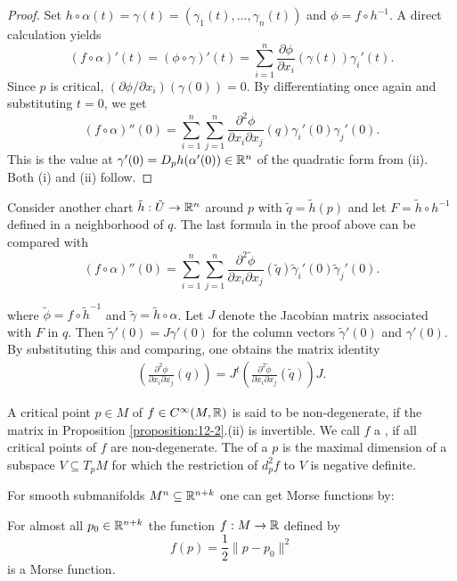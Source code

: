 \begin{proof}
  Set $h\circ\alpha(t) = \gamma(t) = (\gamma_1(t), \ldots, \gamma_n(t))$ and $\phi = f\circ h^{-1}$. A direct 
  calculation yields
  \[
    (f\circ\alpha)'(t)
    = (\phi\circ\gamma)'(t)
    = \sum_{i=1}^{n}{\frac{\partial\phi}{\partial x_i}(\gamma(t))\gamma_i'(t)}.
  \]
  Since $p$ is critical, $(\partial\phi/\partial x_i)(\gamma(0)) = 0$. By differentiating once again and substituting 
  $t=0$, we get 
  \[
    (f\circ\alpha)''(0)
    = \sum_{i=1}^n\sum_{j=1}^n{\frac{\partial^2\phi}{\partial x_i\partial x_j}(q)\gamma_i'(0)\gamma_j'(0)}.
  \]
  This is the value at $\gamma'(0) = D_ph(\alpha'(0))\in{\ensuremath{\mathbb{R}}}^n$ of the quadratic form from (ii).
  Both (i) and (ii) follow.
\end{proof}

Consider another chart $\tilde{h}:\tilde{U}\to{\ensuremath{\mathbb{R}}}^n$ around $p$ with $\tilde{q} = \tilde{h}(p)$ and let $F=\tilde{h}\circ h^{-1}$
defined in a neighborhood of $q$. The last formula in the proof above can be compared with 
\[ 
  (f\circ\alpha)''(0)
  = \sum_{i=1}^n\sum_{j=1}^n{\frac{\partial^2\tilde{\phi}}{\partial x_i\partial x_j}(\tilde{q})\tilde\gamma_i'(0)\tilde\gamma_j'(0)}.
\]

where $\tilde{\phi} = f\circ\tilde{h}^{-1}$ and $\tilde{\gamma}=\tilde{h}\circ\alpha$. Let $J$ denote the Jacobian matrix associated
with $F$ in $q$. Then $\tilde{\gamma}'(0)=J\gamma'(0)$ for the column vectors $\tilde{\gamma}'(0)$ and $\gamma'(0)$. 
By substituting this and comparing, one obtains the matrix identity
\begin{align}\label{eq:12-3}
  \left(\frac{\partial^2\phi}{\partial x_i\partial x_j}(q)\right) 
  = J^t\left(\frac{\partial^2\tilde{\phi}}{\partial x_i\partial x_j }(\tilde{q})\right)J.
\end{align}

\begin{definition}\label{definition:12-3}
  A critical point $p\in M$ of $f\in C^\infty(M, {\mathbb{R}})$ is said to be non-degenerate, if the matrix in 
Proposition \ref{proposition:12-2}.(ii) is invertible. We call $f$ a , if all critical points of $f$ are 
non-degenerate. The  of a  $p$ is the maximal dimension of a subspace $V\subseteq T_pM$ for
which the restriction of $d_p^2f$ to $V$ is negative definite.
\end{definition}

For smooth submanifolds $M^n\subseteq{\ensuremath{\mathbb{R}}}^{n+k}$ one can get Morse functions by:
\begin{theorem}\label{theorem:12-4}
  For almost all $p_0\in{\ensuremath{\mathbb{R}}}^{n+k}$ the function $f:M\to{\ensuremath{\mathbb{R}}}$ defined by
  \[
    f(p) = \frac{1}{2}\|p-p_0\|^2
  \]
  is a Morse function.
\end{theorem}

